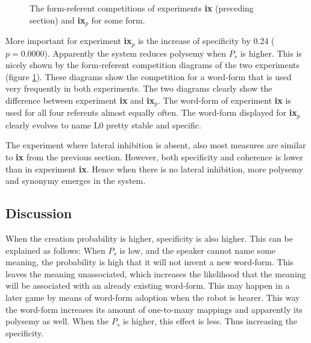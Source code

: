 \begin{figure}[t]
\centering
{}
\caption{The form-referent competitions of experiments {\bf ix} (preceding section) and {\bf ix$_p$} for some form.}
\label{f:par:FR-comp}
\end{figure}

More important for experiment {\bf ix$_p$} is the increase of specificity by 0.24 ($p=0.0000$). Apparently the system reduces polysemy when $P_s$ is higher. This is nicely shown by the form-referent competition diagrams of the two experiments (figure \ref{f:par:FR-comp}). These diagrams show the competition for a word-form that is used very frequently in both experiments. The two diagrams clearly show the difference between experiment {\bf ix} and {\bf ix$_p$}. The word-form of experiment {\bf ix} is used for all four referents almost equally often. The word-form displayed for {\bf ix$_p$} clearly evolves to name L0 pretty stable and specific.


The experiment where lateral inhibition is absent, also most measures are similar to {\bf ix} from the previous section. However, both specificity and coherence is lower than in experiment {\bf ix}. Hence when there is no lateral inhibition, more polysemy and synonymy emerges in the system.

\subsection{Discussion}

When the creation probability is higher, specificity is also higher. This can be explained as follows: When $P_s$ is low, and the speaker cannot name some meaning, the probability is high that it will not invent a new word-form. This leaves the meaning unassociated, which increases the likelihood that the meaning will be associated with an already existing word-form. This may happen in a later game by means of word-form adoption when the robot is hearer. This way the word-form increases its amount of one-to-many mappings and apparently its polysemy as well. When the $P_s$ is higher, this effect is less. Thus increasing the specificity.


